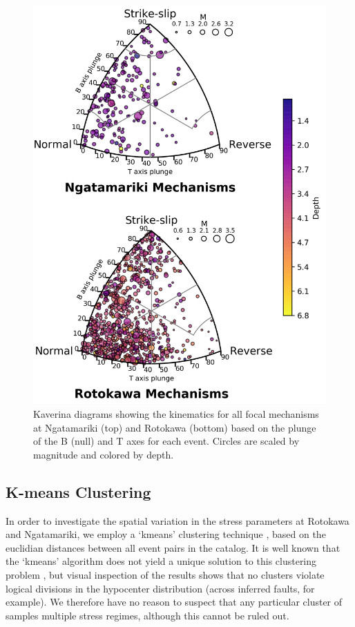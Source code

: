 \begin{figure}[h!]
\begin{center}
\includegraphics[width=0.8\columnwidth]{Chapter_5_FMs/figures/FMC_plots/Merc_ALL_FMC_crop}
\caption[Kaverina diagrams of focal mechanism solutions at both fields]{{
Kaverina diagrams \citep{kaverina1996global,alvarez2014fmc} showing the kinematics for all focal mechanisms at Ngatamariki (top) and Rotokawa (bottom) based on the plunge of the B (null) and T axes for each event. Circles are scaled by magnitude and colored by depth.
{\label{FMC}}%
}}
\end{center}
\end{figure}

\subsection{K-means Clustering}
In order to investigate the spatial variation in the stress parameters at Rotokawa and Ngatamariki, we employ a `kmeans' clustering technique \citep{hartigan1975clustering}, based on the euclidian distances between all event pairs in the catalog. It is well known that the `kmeans' algorithm does not yield a unique solution to this clustering problem \citep[as noted by][]{Townend_2012}, but visual inspection of the results shows that no clusters violate logical divisions in the hypocenter distribution (across inferred faults, for example). We therefore have no reason to suspect that any particular cluster of samples multiple stress regimes, although this cannot be ruled out.

